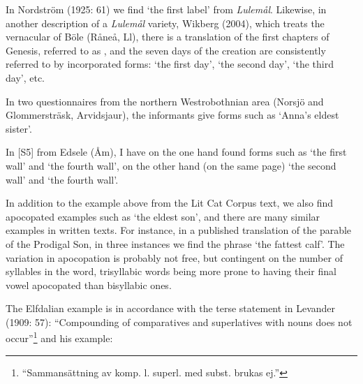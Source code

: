 In Nordström (1925: 61) we find  ‘the first label’ from \textit{Lulemål}. Likewise, in another description of a \textit{Lulemål} variety, Wikberg (2004), which treats the vernacular of Böle (Råneå, Ll), there is a translation of the first chapters of Genesis, referred to as , and the seven days of the creation are consistently referred to by incorporated forms:  ‘the first day’,  ‘the second day’,  ‘the third day’, etc. 

In two questionnaires from the northern Westrobothnian area (Norsjö and Glommersträsk, Arvidsjaur), the informants give forms such as  ‘Anna’s eldest sister’.

In [S5] from Edsele (Åm), I have on the one hand found forms such as  ‘the first wall’ and ‘the fourth wall’, on the other hand (on the same page)  ‘the second wall’ and ‘the fourth wall’.

In addition to the example above from the Lit Cat Corpus text, we also find apocopated examples such as  ‘the eldest son’, and there are many similar examples in written texts. For instance, in a published translation of the parable of the Prodigal Son, in three instances we find the phrase  ‘the fattest calf’. The variation in apocopation is probably not free, but contingent on the number of syllables in the word, trisyllabic words being more prone to having their final vowel apocopated than bisyllabic ones. 

The Elfdalian example is in accordance with the terse statement in Levander (1909: 57): “Compounding of comparatives and superlatives with nouns does not occur”\footnote{ “Sammansättning av komp. l. superl. med subst. brukas ej.”} and his example:

